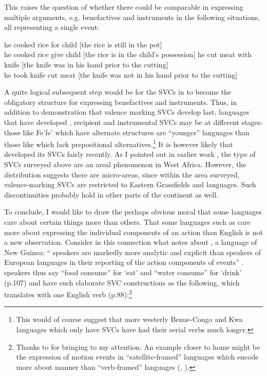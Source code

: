 \documentclass[output=paper]{langsci/langscibook}
\begin{document}
This raises the question of whether there could be comparable  in expressing multiple arguments, e.g. benefactives and instruments in the following situations, all representing a single event:

\ea
\label{ex:hyman:35}
\ea 
he cooked rice for child  [the rice is still in the pot]\\
he cooked rice give child  [the rice is in the child’s possession]
\ex 
he cut meat with knife  [the knife was in his hand prior to the cutting] \\
he took knife cut meat  [the knife was not in his hand prior to the cutting]
\z 
\z 

\noindent
A quite logical subsequent step would be for the SVCs in  to become the obligatory structure for expressing benefactives and instruments. Thus, in addition to  demonstration that valence marking SVCs develop last, languages that have developed , recipient and instrumental SVCs may be at different stages: those like Fe’fe’ which have alternate structures are “younger”  languages than those like  which lack prepositional alternatives.\footnote{This would of course suggest that more westerly Benue-Congo and Kwa languages which only have SVCs have had their serial verbs much longer.} It is however likely that  developed its SVCs fairly recently. As I pointed out in earlier work \citep[139--141]{Hyman1975}, the type of SVCs surveyed above are an areal phenomenon in West Africa. However, the  distribution suggests there are micro-areas, since within the area surveyed, valence-marking SVCs are restricted to Eastern Grassfields  and  languages. Such discontinuities probably hold in other parts of the continent as well.

To conclude, I would like to draw the perhaps obvious moral that some languages care about certain things more than others. That some languages such as  care more about expressing the individual components of an action than English is not a new observation. Consider in this connection what \citet[87]{Pawley1993} notes about , a language of New Guinea:
“ speakers are markedly more analytic and explicit than speakers of European languages in their reporting of the action components of events” \citep[87]{Pawley1993}.
 speakers thus say “food consume” for ‘eat’ and “water consume” for ‘drink’ (p.107) and have such elaborate SVC constructions as the following, which \citeauthor{Pawley1993} translates with one English verb (p.88):\footnote{Thanks to \citet{Woodbury2015} for bringing \citet{Pawley1993} to my attention. An example closer to home might be the expression of motion events in  “satellite-framed”  languages which encode more about manner than “verb-framed”  languages (\citealt{Talmy1991}, \citealt{Slobin2003}).}
\end{document}
